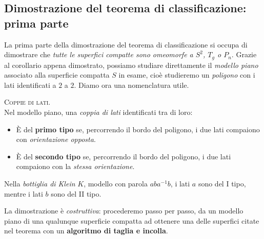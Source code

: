\subsection{Dimostrazione del teorema di classificazione: prima parte}
La prima parte della dimostrazione del teorema di classificazione si occupa di dimostrare che \textit{tutte le superfici compatte sono omeomorfe a $S^2$, $T_g$ o $P_n$}. Grazie al corollario appena dimostrato, possiamo studiare direttamente il \textit{modello piano} associato alla superficie compatta $S$ in esame, cioè studieremo un \textit{poligono} con i lati identificati a $2$ a $2$. Diamo ora una nomenclatura utile.
\begin{define}\textsc{Coppie di lati.}\\
	Nel modello piano, una \textit{coppia di lati} identificati tra di loro:
	\begin{itemize}
		\item È del \textbf{primo tipo} se, percorrendo il bordo del poligono, i due lati compaiono con \textit{orientazione opposta}.
		\item È del \textbf{secondo tipo} se, percorrendo il bordo del poligono, i due lati compaiono con la \textit{stessa orientazione}.
	\end{itemize}
\vspace{-3mm}
\end{define}
\begin{example}
	Nella \textit{bottiglia di Klein} $K$, modello con parola $aba^{-1}b$, i lati $a$ sono del I tipo, mentre i lati $b$ sono del II tipo.
\end{example}
La dimostrazione è \textit{costruttiva}: procederemo passo per passo, da un modello piano di una qualunque superficie compatta ad ottenere una delle superfici citate nel teorema con un \textbf{algoritmo di taglia e incolla}.
